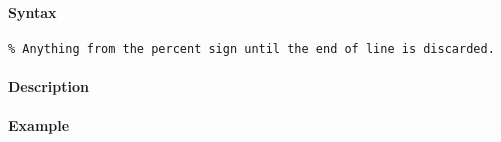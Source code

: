 


	\paragraph{Syntax}

\begin{verbatim}
% Anything from the percent sign until the end of line is discarded.
\end{verbatim}

\paragraph{Description}

\paragraph{Example}


